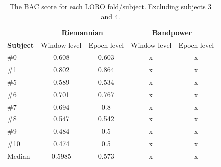         \begin{table}[h]
            \centering
            \begin{tabular}{lcccc}
                \toprule
                & \multicolumn{2}{c}{\textbf{Riemannian}} & \multicolumn{2}{c}{\textbf{Bandpower}} \\
                \cmidrule(lr){2-3}
                \cmidrule(lr){4-5}
                \textbf{Subject} & Window-level & Epoch-level & Window-level & Epoch-level \\
                \midrule
                \#0  & 0.608  & 0.603 & x & x \\
                \#1  & 0.802  & 0.864 & x & x \\
                \#5  & 0.589  & 0.534 & x & x \\
                \#6  & 0.701  & 0.767 & x & x \\
                \#7  & 0.694  & 0.8   & x & x \\
                \#8  & 0.547  & 0.542 & x & x \\
                \#9  & 0.484  & 0.5   & x & x \\
                \#10 & 0.474  & 0.5   & x & x \\
                \midrule
                Median & 0.5985 & 0.573 & x & x \\
                \bottomrule
            \end{tabular}
            \caption{The BAC score for each LORO fold/subject. Excluding subjects 3 and 4.}\label{table:bac-all}
        \end{table}


